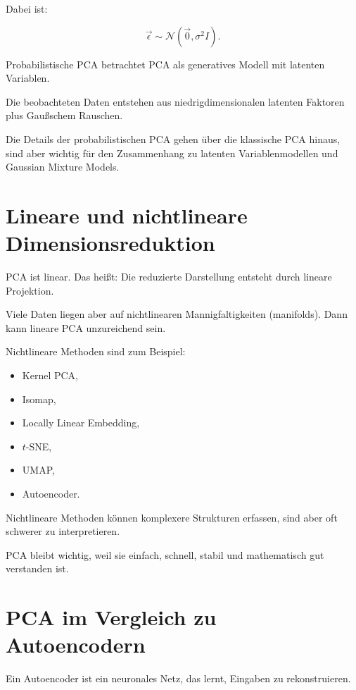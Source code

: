 Dabei ist:

\[
    \vec{\epsilon}
    \sim
    \mathcal{N}(\vec{0},\sigma^2 I).
\]

\begin{conceptbox}
Probabilistische PCA betrachtet PCA als generatives Modell mit latenten Variablen.

Die beobachteten Daten entstehen aus niedrigdimensionalen latenten Faktoren plus Gaußschem Rauschen.
\end{conceptbox}

Die Details der probabilistischen PCA gehen über die klassische PCA hinaus, sind aber wichtig für den Zusammenhang zu latenten Variablenmodellen und Gaussian Mixture Models.

\section{Lineare und nichtlineare Dimensionsreduktion}

PCA ist linear.
Das heißt:
Die reduzierte Darstellung entsteht durch lineare Projektion.

Viele Daten liegen aber auf nichtlinearen Mannigfaltigkeiten (manifolds).
Dann kann lineare PCA unzureichend sein.

Nichtlineare Methoden sind zum Beispiel:

\begin{itemize}
    \item Kernel PCA,
    \item Isomap,
    \item Locally Linear Embedding,
    \item \(t\)-SNE,
    \item UMAP,
    \item Autoencoder.
\end{itemize}

\begin{notebox}
Nichtlineare Methoden können komplexere Strukturen erfassen, sind aber oft schwerer zu interpretieren.

PCA bleibt wichtig, weil sie einfach, schnell, stabil und mathematisch gut verstanden ist.
\end{notebox}

\section{PCA im Vergleich zu Autoencodern}

Ein Autoencoder ist ein neuronales Netz, das lernt, Eingaben zu rekonstruieren.

